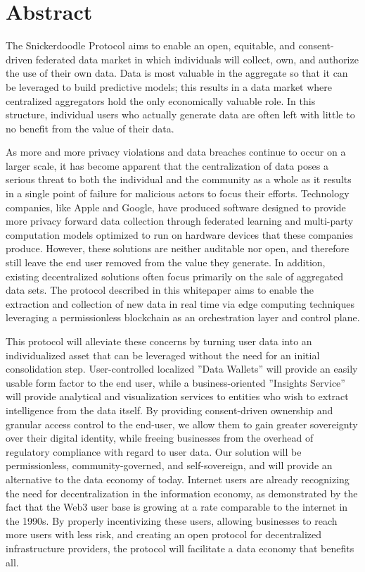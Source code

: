\section{Abstract}

The Snickerdoodle Protocol aims to enable an open, equitable, and consent-driven federated data market in which individuals will 
collect, own, and authorize the use of their own data. Data is most valuable in the aggregate so that 
it can be leveraged to build predictive models; this results in a data market where centralized aggregators hold 
the only economically valuable role. In this structure, individual users who actually generate data are often 
left with little to no benefit from the value of their data. 

As more and more privacy violations and data breaches continue to occur on a larger scale, it has become apparent that the
centralization of data poses a serious threat to both the individual and the community as a whole as it results in a
single point of failure for malicious actors to focus their efforts. Technology companies, like Apple and Google, have
produced software designed to provide more privacy forward data collection through federated learning and multi-party 
computation models optimized to run on hardware devices that these companies produce. However, these solutions are 
neither auditable nor open, and therefore still leave the end user removed from the value they generate. In addition, 
existing decentralized solutions often focus primarily on the sale of aggregated data sets. The protocol described in this 
whitepaper aims to enable the extraction and collection of new data in real time via edge computing techniques leveraging
a permissionless blockchain as an orchestration layer and control plane. 

This protocol will alleviate these concerns by turning user data into an individualized asset that can be leveraged 
without the need for an initial consolidation step. User-controlled localized ”Data Wallets” will provide an easily usable form 
factor to the end user, while a business-oriented ”Insights Service” will provide analytical and visualization services to entities who wish to extract 
intelligence from the data itself. By providing consent-driven ownership and granular access control to the end-user, we allow them to gain greater sovereignty over their 
digital identity, while freeing businesses from the overhead of regulatory compliance with regard to user data. Our solution will be 
permissionless, community-governed, and self-sovereign, and will provide an alternative to the data economy of today. Internet users 
are already recognizing the need for decentralization in the information economy, as demonstrated by the fact that the Web3 user base 
is growing at a rate comparable to the internet in the 1990s. By properly incentivizing these users, allowing businesses to reach more 
users with less risk, and creating an open protocol for decentralized infrastructure providers, the protocol will facilitate 
a data economy that benefits all. 